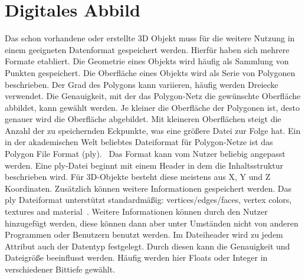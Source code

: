 \section{Digitales Abbild}

Das schon vorhandene oder erstellte 3D Objekt muss für die weitere Nutzung
in einem geeigneten Datenformat gespeichert werden. Hierfür haben sich mehrere
Formate etabliert. Die Geometrie eines Objekts wird häufig als Sammlung von Punkten 
gespeichert. Die Oberfläche eines Objekts wird als Serie von Polygonen beschrieben. 
Der Grad des Polygons kann variieren, häufig werden Dreiecke verwendet. 
Die Genauigkeit, mit der das Polygon-Netz die gewünschte Oberfläche 
abbildet, kann gewählt werden. 
Je kleiner die Oberfläche der Polygonen ist, desto genauer wird die Oberfläche 
abgebildet. Mit kleineren Oberflächen steigt die Anzahl der zu speichernden 
Eckpunkte, was eine größere Datei zur Folge hat.
Ein in der akademischen Welt beliebtes Dateiformat für Polygon-Netze ist das 
Polygon File Format (ply).\ \cite{KentonMchenry.2008}
Das Format kann vom Nutzer beliebig angepasst werden. Eine ply-Datei beginnt mit 
einem Header in dem die Inhaltsstruktur beschrieben wird. 
Für 3D-Objekte besteht diese meistens aus X, Y und Z Koordinaten. 
Zusätzlich können weitere Informationen gespeichert werden. Das ply Dateiformat 
unterstützt standardmäßig: \glqq vertices/edges/faces, vertex colors, textures and
material\grqq ~\cite{KentonMchenry.2008}. Weitere Informationen können durch den Nutzer 
hinzugefügt werden, 
diese können dann aber unter Umständen nicht von anderen Programmen oder Benutzern
benutzt werden.
Im Dateiheader wird zu jedem Attribut auch der Datentyp festgelegt. Durch diesen 
kann die Genauigkeit und Dateigröße beeinflusst werden. Häufig werden hier Floats oder
Integer in verschiedener Bittiefe gewählt.

